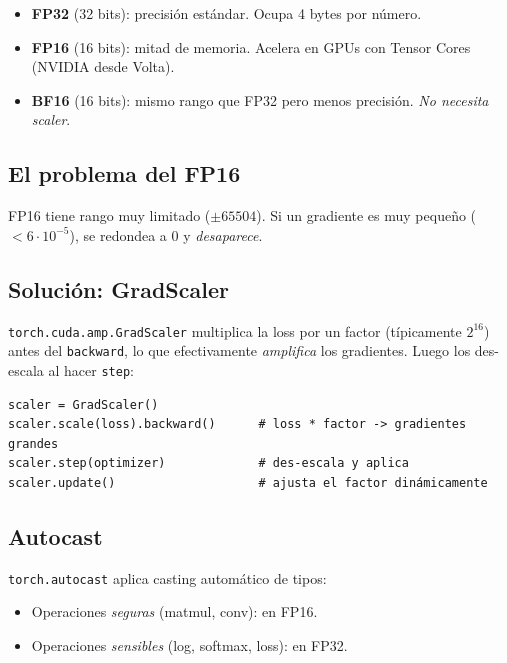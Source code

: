 \begin{itemize}
  \item \textbf{FP32} (32 bits): precisión estándar. Ocupa 4
        bytes por número.
  \item \textbf{FP16} (16 bits): mitad de memoria. Acelera en
        GPUs con Tensor Cores (NVIDIA desde Volta).
  \item \textbf{BF16} (16 bits): mismo rango que FP32 pero
        menos precisión. \emph{No necesita scaler}.
\end{itemize}

\subsection{El problema del FP16}

FP16 tiene rango muy limitado ($\pm 65504$). Si un gradiente es
muy pequeño ($< 6 \cdot 10^{-5}$), se redondea a 0 y
\emph{desaparece}.

\subsection{Solución: GradScaler}

\texttt{torch.cuda.amp.GradScaler} multiplica la loss por un
factor (típicamente $2^{16}$) antes del \texttt{backward}, lo
que efectivamente \emph{amplifica} los gradientes. Luego los
des-escala al hacer \texttt{step}:

\begin{verbatim}
scaler = GradScaler()
scaler.scale(loss).backward()      # loss * factor -> gradientes grandes
scaler.step(optimizer)             # des-escala y aplica
scaler.update()                    # ajusta el factor dinámicamente
\end{verbatim}

\subsection{Autocast}

\texttt{torch.autocast} aplica casting automático de tipos:

\begin{itemize}
  \item Operaciones \emph{seguras} (matmul, conv): en FP16.
  \item Operaciones \emph{sensibles} (log, softmax, loss): en
        FP32.
\end{itemize}

